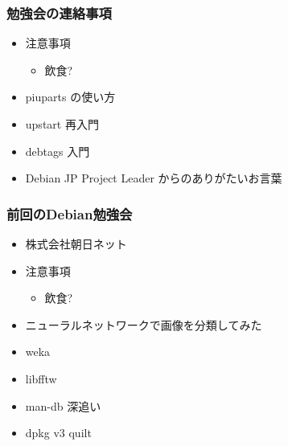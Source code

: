 \frame{\titlepage{}}


\begin{frame}
 \frametitle{勉強会の連絡事項}
\begin{minipage}[t]{0.45\hsize}
  \begin{itemize}
   \item 注意事項
	 \begin{itemize}
	  \item 飲食?
	 \end{itemize}
  \end{itemize}
\end{minipage} 
\begin{minipage}[t]{0.45\hsize}
 \begin{itemize}
  \item piuparts の使い方
  \item upstart 再入門
  \item debtags 入門
  \item Debian JP Project Leader からのありがたいお言葉
 \end{itemize}
\end{minipage}
\end{frame}


\begin{frame}
 \frametitle{前回のDebian勉強会}
\begin{minipage}[t]{0.45\hsize}
  \begin{itemize}
   \item 株式会社朝日ネット 
   \item 注意事項
         \begin{itemize}
          \item 飲食?
         \end{itemize}
  \end{itemize}
\end{minipage}
\begin{minipage}[t]{0.45\hsize}
 \begin{itemize}
  \item ニューラルネットワークで画像を分類してみた
  \item weka
  \item libfftw
  \item man-db 深追い
  \item dpkg v3 quilt
 \end{itemize}
\end{minipage}
\end{frame}

